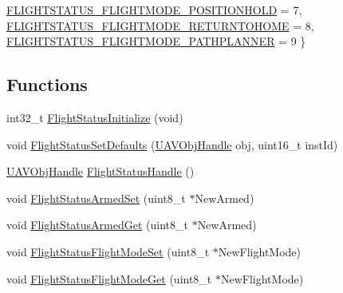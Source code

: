 \begin{DoxyCompactItemize}
\hyperlink{group___flight_status_gga72d8d10af826df243cd0d1f47a66f903a3643d0d0d4b3100a1167736ef02c5be1}{\-F\-L\-I\-G\-H\-T\-S\-T\-A\-T\-U\-S\-\_\-\-F\-L\-I\-G\-H\-T\-M\-O\-D\-E\-\_\-\-P\-O\-S\-I\-T\-I\-O\-N\-H\-O\-L\-D} = 7, 
\*
\hyperlink{group___flight_status_gga72d8d10af826df243cd0d1f47a66f903a2dbfe51c9e59e130e855a1bd0c609fd9}{\-F\-L\-I\-G\-H\-T\-S\-T\-A\-T\-U\-S\-\_\-\-F\-L\-I\-G\-H\-T\-M\-O\-D\-E\-\_\-\-R\-E\-T\-U\-R\-N\-T\-O\-H\-O\-M\-E} = 8, 
\hyperlink{group___flight_status_gga72d8d10af826df243cd0d1f47a66f903a9653cb59aef791c81ab0010821fe4f35}{\-F\-L\-I\-G\-H\-T\-S\-T\-A\-T\-U\-S\-\_\-\-F\-L\-I\-G\-H\-T\-M\-O\-D\-E\-\_\-\-P\-A\-T\-H\-P\-L\-A\-N\-N\-E\-R} = 9
 \}
\end{DoxyCompactItemize}
\subsection*{\-Functions}
\begin{DoxyCompactItemize}
\item 
int32\-\_\-t \hyperlink{group___flight_status_ga8cd1e2e12de49bfe5e68345f8ec061d2}{\-Flight\-Status\-Initialize} (void)
\item 
void \hyperlink{group___flight_status_ga61e34da642778814d1028727f74410d0}{\-Flight\-Status\-Set\-Defaults} (\hyperlink{targets_2_u_a_v_objects_2inc_2uavobjectmanager_8h_a279053e22be53ce9f895043aaeb91e3b}{\-U\-A\-V\-Obj\-Handle} obj, uint16\-\_\-t inst\-Id)
\item 
\hyperlink{targets_2_u_a_v_objects_2inc_2uavobjectmanager_8h_a279053e22be53ce9f895043aaeb91e3b}{\-U\-A\-V\-Obj\-Handle} \hyperlink{group___flight_status_gab20f9c01d887d1ac440166cb3f0e2746}{\-Flight\-Status\-Handle} ()
\item 
void \hyperlink{group___flight_status_gab89326c38ccb8c12aea7652cb9e11aa9}{\-Flight\-Status\-Armed\-Set} (uint8\-\_\-t $\ast$\-New\-Armed)
\item 
void \hyperlink{group___flight_status_ga21847e23e60805238e9cba63aec84876}{\-Flight\-Status\-Armed\-Get} (uint8\-\_\-t $\ast$\-New\-Armed)
\item 
void \hyperlink{group___flight_status_ga5fcc9173320f9905d2061c1844af74f2}{\-Flight\-Status\-Flight\-Mode\-Set} (uint8\-\_\-t $\ast$\-New\-Flight\-Mode)
\item 
void \hyperlink{group___flight_status_ga249a66bdf66d367514f7b01ecd0336f3}{\-Flight\-Status\-Flight\-Mode\-Get} (uint8\-\_\-t $\ast$\-New\-Flight\-Mode)
\end{DoxyCompactItemize}


